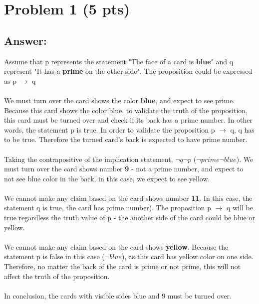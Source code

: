 \newpage

\section{Problem 1 (5 pts)}

\subsection{Answer:}

Assume that p represents the statement "The face of a card is \textbf{blue}" and  q represent "It has a \textbf{prime} on the other side". The proposition could be expressed as p $\rightarrow$ q  \\ \\
We must turn over the card shows the color \textbf{blue}, and expect to see prime. Because this card shows the color blue, to validate the truth of the proposition, this card must be turned over and check if its back has a prime number. In other words, the statement p is true. In order to validate the proposition p $\rightarrow$ q, q has to be true. Therefore the turned card's back is expected to have prime number. \\ \\
Taking the contrapositive of the implication statement, $\neg q $\rightarrow$ \neg p$ ($\neg prime $\rightarrow$ \neg blue$). We must turn over the card shows number \textbf{9} - not a prime number, and expect to not see blue color in the back, in this case, we expect to see yellow. \\ \\
We cannot make any claim based on the card shows number \textbf{11}. In this case, the statement q is true, the card has prime number). The proposition p $\rightarrow$ q will be true regardless the truth value of p - the another side of the card could be blue or yellow. \\ \\
We cannot make any claim based on the card shows \textbf{yellow}. Because the statement p is false in this case ($\neg blue$), as this card has yellow color on one side. Therefore, no matter the back of the card is prime or not prime, this will not affect the truth of the proposition. \\ \\
In conclusion, the cards with visible sides blue and 9 must be turned over.

